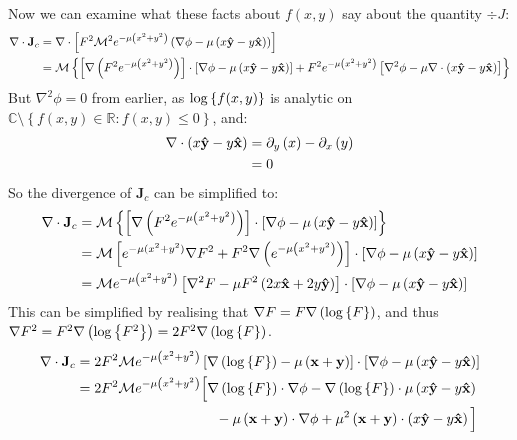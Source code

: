\documentclass{article}
\begin{document}
Now we can examine what these facts about $f(x,y)$ say about the quantity
$\div{J}$:
\begin{align}
    \nabla \cdot \mathbf{J}_c &= \nabla \cdot \left[ F^2 \mathcal{M}^2 e^{-
        \mu \left( x^2 + y^2 \right)} \left(
        \nabla \phi - \mu \left( x\mathbf{ \hat{ y }} -
        y\mathbf{ \hat{ x }} \right) \right) \right] \\
    &= \mathcal{M} \left\{ \left[
        \nabla \left( F^2 e^{- \mu \left( x^2 + y^2 \right)} \right) \right]
        \cdot \left[ \nabla \phi - \mu \left( x\mathbf{ \hat{ y }} - y \mathbf{ \hat{ x }} \right)
        \right]
        + F^2 e^{- \mu \left( x^2 + y^2 \right)} \left[ \nabla^2 \phi - \mu \nabla
        \cdot \left( x\mathbf{ \hat{ y }} - y\mathbf{ \hat{ x }} \right) \right]
        \right\}
\end{align}
But $\nabla^2 \phi = 0$ from earlier, as $\log \left\{ f(x,y) \right\}$ is analytic on
$\mathbb{C} \setminus \left\{ f(x,y) \in \mathbb{R} : f(x,y) \leq 0 \right\}$, and:
\begin{align}
    \nabla \cdot \left( x\mathbf{ \hat{ y }} - y\mathbf{ \hat{ x }} \right)
    &= \partial_y \left( x \right) - \partial_x \left( y \right) \\
    &= 0
\end{align}
So the divergence of $\mathbf{J}_c$ can be simplified to:
\begin{align}
    \nabla \cdot \mathbf{J}_c &= \mathcal{M} \left\{
        \left[ \nabla \left( F^2 e^{- \mu \left( x^2 + y^2 \right)} \right)
            \right] \cdot
        \left[ \nabla \phi - \mu \left( x \mathbf{ \hat{ y }} - y \mathbf{ \hat{ x }} \right)
            \right] \right\} \\
    &= \mathcal{M} \left[ e^{- \mu (x^2+ y^2) } \nabla F^2
        + F^2 \nabla \left(e^{- \mu \left( x^2 + y^2 \right)} \right)
        \right] \cdot
        \left[ \nabla \phi- \mu \left(x\mathbf{ \hat{ y }} - y\mathbf{ \hat{ x }} \right) \right] \\
    &= \mathcal{M} e^{- \mu \left(x^2 + y^2\right)} \left[ \nabla^2 F
        - \mu F^2 \left( 2x\mathbf{ \hat{ x }} + 2y\mathbf{ \hat{ y }} \right) \right] \cdot
        \left[ \nabla \phi- \mu \left(x\mathbf{ \hat{ y }} - y\mathbf{ \hat{ x }} \right) \right] \\
\end{align}
This can be simplified by realising that $\nabla F = F \nabla \left( \log \left\{ F \right\}
\right)$, and thus $\nabla F^2 = F^2 \nabla \left( \log \left\{ F^2 \right\} \right) =
2 F^2 \nabla \left( \log \left\{ F \right\} \right)$.
\begin{align}
    \div{J}_c &= 2F^2\mathcal{M} e^{- \mu \left( x^2 + y^2 \right)}
        \left[ \nabla \left( \logg{F} \right) -\mu \left( \mathbf{x} + \mathbf{y}
        \right) \right]
        \cdot \left[ \nabla \phi - \mu \left( x\basis{y} - y\basis{x} \right)
        \right] \\
        &= 2F^2 \mathcal{M} e^{- \mu \left( x^2 + y^2 \right)}
        \Big[ \nabla \left( \logg{F} \right) \cdot \nabla \phi
            - \nabla \left( \logg{F} \right) \cdot \mu
                \left( x\basis{y} - y\basis{x} \right) \notag \\
                & \hspace{100pt} - \mu \left( \mathbf{x} + \mathbf{y} \right) \cdot \nabla \phi
        + \mu^2 \left( \mathbf{x} + \mathbf{y} \right) \cdot
            \left( x\basis{y} - y\basis{x} \right) \Big]
\end{align}
\end{document}
